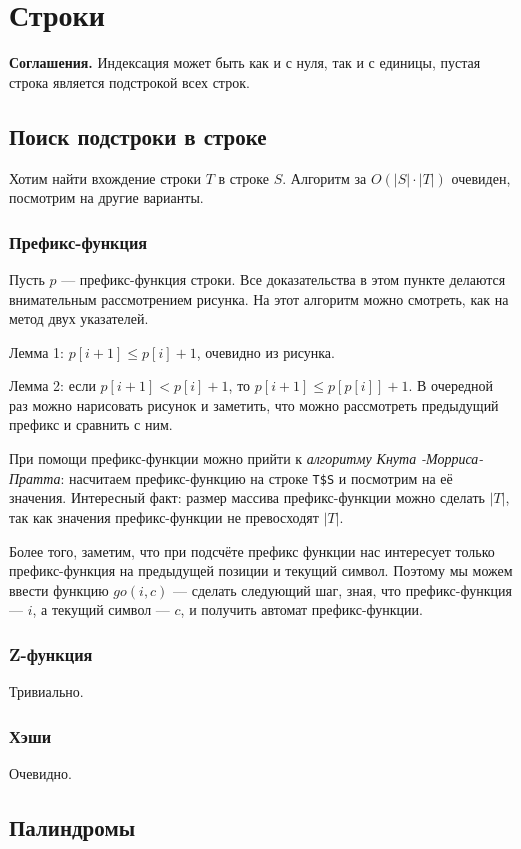 \section{Строки}
\textbf{Соглашения.} Индексация может быть как и с нуля, так и с единицы, пустая строка является подстрокой всех строк.

\subsection{Поиск подстроки в строке}
Хотим найти вхождение строки $T$ в строке $S$. Алгоритм за $O(|S| \cdot |T|)$ очевиден, посмотрим на другие варианты.

\subsubsection{Префикс-функция}
Пусть $p$ --- префикс-функция строки. Все доказательства в этом пункте делаются внимательным рассмотрением рисунка.
На этот алгоритм можно смотреть, как на метод двух указателей.

Лемма 1: $p[i + 1] \le p[i] + 1$, очевидно из рисунка.

Лемма 2: если $p[i + 1] < p[i] + 1$, то $p[i + 1] \le p[p[i]] + 1$.
В очередной раз можно нарисовать рисунок и заметить, что можно рассмотреть предыдущий префикс и сравнить с ним.

При помощи префикс-функции можно прийти к \textit{алгоритму Кнута} \textit{-Морриса-Пратта}: насчитаем префикс-функцию на строке \verb+T$S+ и посмотрим на её значения.
Интересный факт: размер массива префикс-функции можно сделать $|T|$, так как значения префикс-функции не превосходят $|T|$.

Более того, заметим, что при подсчёте префикс функции нас интересует только префикс-функция на предыдущей позиции и текущий символ.
Поэтому мы можем ввести функцию $go(i, c)$ --- сделать следующий шаг, зная, что префикс-функция --- $i$, а текущий символ --- $c$, и получить автомат префикс-функции.

\subsubsection{Z-функция}
Тривиально.

\subsubsection{Хэши}
Очевидно.

\subsection{Палиндромы}
